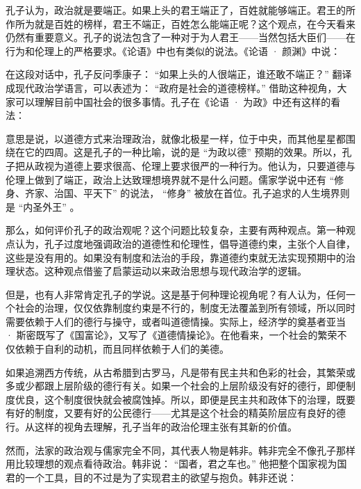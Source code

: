 
孔子认为，政治就是要端正。如果上头的君王端正了，百姓就能够端正。君王的所作所为就是百姓的榜样，君王不端正，百姓怎么能端正呢？这个观点，在今天看来仍然有重要意义。孔子的说法包含了一种对于为人君王——当然包括大臣们——在行为和伦理上的严格要求。《论语》中也有类似的说法。《论语 · 颜渊》中说：


在这段对话中，孔子反问季康子： “如果上头的人很端正，谁还敢不端正？” 翻译成现代政治学语言，可以表述为： “政府是社会的道德榜样。” 借助这种视角，大家可以理解目前中国社会的很多事情。孔子在《论语 · 为政》中还有这样的看法：


意思是说，以道德方式来治理政治，就像北极星一样，位于中央，而其他星星都围绕在它的四周。这是孔子的一种比喻，说的是 “为政以德” 预期的效果。所以，孔子把从政视为道德上要求很高、伦理上要求很严的一种行为。他认为，只要道德与伦理上做到了端正，政治上达致理想境界就不是什么问题。儒家学说中还有 “修身、齐家、治国、平天下” 的说法， “修身” 被放在首位。孔子追求的人生境界则是 “内圣外王” 。

那么，如何评价孔子的政治观呢？这个问题比较复杂，主要有两种观点。第一种观点认为，孔子过度地强调政治的道德性和伦理性，倡导道德约束，主张个人自律，这些是没有用的。如果没有制度和法治的手段，靠道德约束就无法实现预期中的治理状态。这种观点借鉴了启蒙运动以来政治思想与现代政治学的逻辑。

但是，也有人非常肯定孔子的学说。这是基于何种理论视角呢？有人认为，任何一个社会的治理，仅仅依靠制度约束是不行的，制度无法覆盖到所有领域，所以同时需要依赖于人们的德行与操守，或者叫道德情操。实际上，经济学的奠基者亚当 · 斯密既写了《国富论》，又写了《道德情操论》。在他看来，一个社会的繁荣不仅依赖于自利的动机，而且同样依赖于人们的美德。

如果追溯西方传统，从古希腊到古罗马，凡是带有民主共和色彩的社会，其繁荣或多或少都跟上层阶级的德行有关。如果一个社会的上层阶级没有好的德行，即便制度优良，这个制度很快就会被腐蚀掉。所以，即便是民主共和政体下的治理，既要有好的制度，又要有好的公民德行——尤其是这个社会的精英阶层应有良好的德行。从这样的视角去理解，孔子当年的政治伦理主张有其新的价值。

然而，法家的政治观与儒家完全不同，其代表人物是韩非。韩非完全不像孔子那样用比较理想的观点看待政治。韩非说： “国者，君之车也。” 他把整个国家视为国君的一个工具，目的不过是为了实现君主的欲望与抱负。韩非还说：


